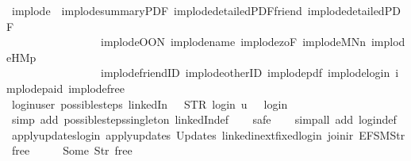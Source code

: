 \begin{isabellebody}
\endisatagproof
{\isafoldproof}%
%
\isadelimproof
\isanewline
%
\endisadelimproof
\isanewline
{}\isamarkupfalse%
\ implode\ {\isacharequal}\ implode{\isacharunderscore}summaryPDF\ implode{\isacharunderscore}detailedPDF{\isacharunderscore}friend\ implode{\isacharunderscore}detailedPDF\isanewline
\ \ \ \ \ \ \ \ \ \ \ \ \ \ \ \ \ implode{\isacharunderscore}OON\ implode{\isacharunderscore}name\ implode{\isacharunderscore}{}zoF\ implode{\isacharunderscore}MNn{}\ implode{\isacharunderscore}HM{}p\isanewline
\ \ \ \ \ \ \ \ \ \ \ \ \ \ \ \ \ implode{\isacharunderscore}friendID\ implode{\isacharunderscore}otherID\ implode{\isacharunderscore}pdf\ implode{\isacharunderscore}login\ implode{\isacharunderscore}paid\ implode{\isacharunderscore}free\isanewline
\isanewline
{}\isamarkupfalse%
\ login{\isacharunderscore}user{\isacharcolon}\ {\isachardoublequoteopen}possible{\isacharunderscore}steps\ linkedIn\ {}\ {\isacharless}{\isachargreater}\ STR\ {\isacharprime}{\isacharprime}login{\isacharprime}{\isacharprime}\ {\isacharbrackleft}u{\isacharbrackright}\ {\isacharequal}\ {\isacharbraceleft}{\isacharbar}{\isacharparenleft}{}{\isacharcomma}\ login{\isacharparenright}{\isacharbar}{\isacharbraceright}{\isachardoublequoteclose}\isanewline
%
\isadelimproof
\ \ %
\endisadelimproof
%
\isatagproof
{}\isamarkupfalse%
\ {\isacharparenleft}simp\ add{\isacharcolon}\ possible{\isacharunderscore}steps{\isacharunderscore}singleton\ linkedIn{\isacharunderscore}def{\isacharparenright}\isanewline
\ \ \isamarkupfalse%
\ safe\isanewline
\ \ \isamarkupfalse%
\ {\isacharparenleft}simp{\isacharunderscore}all\ add{\isacharcolon}\ login{\isacharunderscore}def{\isacharparenright}%
\endisatagproof
{\isafoldproof}%
%
\isadelimproof
\isanewline
%
\endisadelimproof
\isanewline
{}\isamarkupfalse%
\ apply{\isacharunderscore}updates{\isacharunderscore}login{\isacharcolon}\ {\isachardoublequoteopen}apply{\isacharunderscore}updates\ {\isacharparenleft}Updates\ linkedin{\isacharunderscore}ext{\isacharunderscore}fixed{\isachardot}login{\isacharparenright}\ {\isacharparenleft}join{\isacharunderscore}ir\ {\isacharbrackleft}EFSM{\isachardot}Str\ {\isacharprime}{\isacharprime}free{\isacharprime}{\isacharprime}{\isacharbrackright}\ {\isacharless}{\isachargreater}{\isacharparenright}\ {\isacharless}{\isachargreater}\ {\isacharequal}\ {\isacharparenleft}{\isacharless}{\isachargreater}{\isacharparenleft}{}\ {\isachardollar}{\isacharcolon}{\isacharequal}\ Some\ {\isacharparenleft}Str\ {\isacharprime}{\isacharprime}free{\isacharprime}{\isacharprime}{\isacharparenright}{\isacharparenright}{\isacharparenright}{\isachardoublequoteclose}\isanewline

\end{isabellebody}
